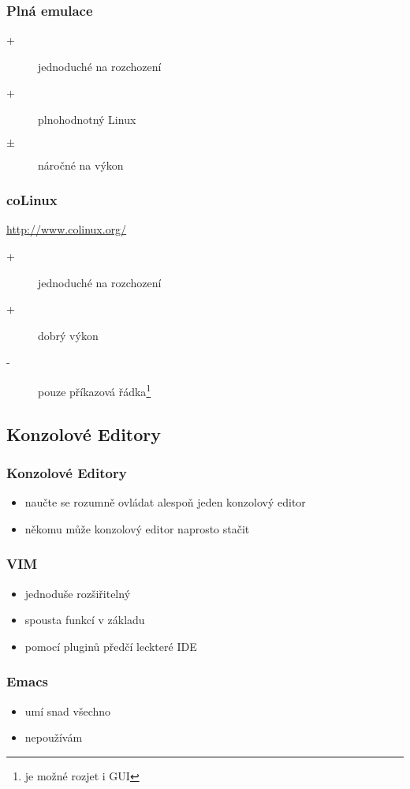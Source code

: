 \begin{frame}
	\frametitle{Plná emulace}
	\begin{description}
		\item[+]{jednoduché na rozchození}
		\item[+]{plnohodnotný Linux}
		\item[$\pm$]{náročné na výkon}
	\end{description}
\end{frame}

\begin{frame}
	\frametitle{coLinux}
	\href{http://www.colinux.org/}{http://www.colinux.org/}
	\begin{description}
		\item[+]{jednoduché na rozchození}
		\item[+]{dobrý výkon}
		\item[-]{pouze příkazová řádka\footnote{je možné rozjet i GUI}}
	\end{description}
\end{frame}

\subsection{Konzolové Editory}

\begin{frame}
	\frametitle{Konzolové Editory}
	\begin{itemize}
		\item{naučte se rozumně ovládat alespoň jeden konzolový editor}
		\item{někomu může konzolový editor naprosto stačit}
	\end{itemize}
\end{frame}

\begin{frame}
	\frametitle{VIM}
	\begin{itemize}
		\item{jednoduše rozšiřitelný}
		\item{spousta funkcí v základu}
		\item{pomocí pluginů předčí leckteré IDE}
	\end{itemize}
\end{frame}

\begin{frame}
	\frametitle{Emacs}
	\begin{itemize}
		\item{umí snad všechno}
		\item{nepoužívám}
	\end{itemize}
\end{frame}

